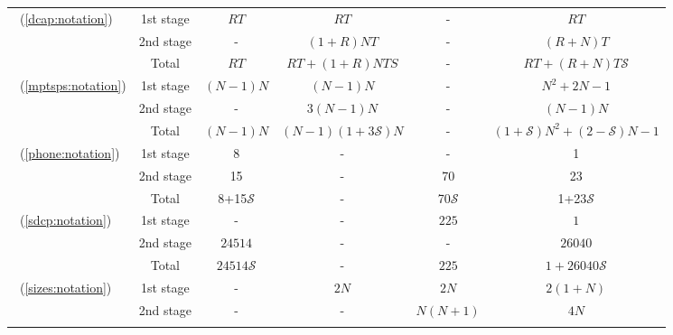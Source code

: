 \begin{table}[H]
{\begin{threeparttable}
\begin{tabular}{@{}lccccc@{}}
				\multirow{3}{*}{\dcap\ (\ref{dcap:notation})}   & 1st stage & $RT$           & $RT$                               & -                    & $RT$                      \\
				& 2nd stage & -             & $(1+R)NT$               & -                    & $(R+N)T$                  \\ \cmidrule(l){2-6} 
				& Total          & $RT$           & $RT+(1+R)NTS$ & -                    & $RT+(R+N)T\mathcal{S}$    \\ \midrule
				\multirow{3}{*}{\mptsps\ (\ref{mptsps:notation})} & 1st stage & $(N-1)N$          & $(N-1)N$                              & -                    & $N^2+2N-1$                \\
				& 2nd stage & -              & $3(N-1)N$                            & -                    & $(N-1)N$                     \\ \cmidrule(l){2-6} 
				& Total          & $(N-1)N$          & $(N-1)(1+3\mathcal{S})N$              & -                    & $(1+\mathcal{S})N^2+(2-\mathcal{S})N-1$ \\ \midrule
				\multirow{3}{*}{\phone\ (\ref{phone:notation})}   & 1st stage & 8           &  -                              &  -                   &  1                     \\
				& 2nd stage &    15          &      -          &      70               &    23               \\ \cmidrule(l){2-6} 
				& Total          &    8+15$\mathcal{S}$        & - &    70$\mathcal{S}$                &  1+23$\mathcal{S}$ \\ \midrule
				\multirow{3}{*}{\sdcp\ (\ref{sdcp:notation})}  & 1st stage & -              & -                               & $225$                  & $1$                  \\
				& 2nd stage & $24514$              & -                                  & -             & $26040$                     \\ \cmidrule(l){2-6} 
				& Total          & $24514\mathcal{S}$              & -                               & $225$ & $1+26040\mathcal{S}$    \\ \midrule
				\multirow{3}{*}{\sizes\ (\ref{sizes:notation})}  & 1st stage & -              & $2N$                               & $2N$                 & $2(1+N)$                  \\
				& 2nd stage & -              & -                                  & $N(N+1)$              & $4N$                     \\ \cmidrule(l){2-6} 

\end{tabular}
\end{threeparttable}}
\end{table}
